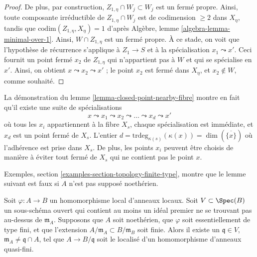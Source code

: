 \begin{proof}
De plus, par construction, $Z_{1, \eta} \cap W_j \subset W_j$
est un fermé propre. Ainsi, toute composante irréductible de
$Z_{1, \eta} \cap W_j$ est de codimension $\geq 2$ dans $X_\eta$,
tandis que $\text{codim}(Z_{1, \eta}, X_\eta) = 1$ d'après
Algèbre, lemme \ref{algebra-lemma-minimal-over-1}.
Ainsi, $W \cap Z_{1, \eta}$ est un fermé propre.
À ce stade, on voit que l'hypothèse de récurrence s'applique à
$Z_1 \to S$ et à la spécialisation $x_1 \leadsto x'$.
Ceci fournit un point fermé $x_2$ de $Z_{1, \eta}$ qui n'appartient pas
à $W$ et qui se spécialise en $x'$. Ainsi, on obtient
$x \leadsto x_2 \leadsto x'$ ; le point $x_2$ est fermé dans $X_\eta$,
et $x_2 \not \in W$, comme souhaité.
\end{proof}

\begin{remark}
\label{remark-full-specialization-sequence}
La démonstration du
lemme \ref{lemma-closed-point-nearby-fibre}
montre en fait qu'il existe une suite de spécialisations
$$
x \leadsto x_1 \leadsto x_2 \leadsto \ldots \leadsto x_d \leadsto x'
$$
où tous les $x_i$ appartiennent à la fibre $X_s$, chaque spécialisation est
immédiate, et $x_d$ est un point fermé de $X_s$. L'entier
$d = \text{trdeg}_{\kappa(s)}(\kappa(x)) = \dim(\overline{\{x\}})$
où l'adhérence est prise dans $X_s$. De plus, les points
$x_i$ peuvent être choisis de manière à éviter tout fermé de $X_s$ qui
ne contient pas le point $x$.
\end{remark}

\noindent
Exemples, section \ref{examples-section-topology-finite-type},
montre que le lemme suivant est faux si $A$ n'est pas supposé
noethérien.

\begin{lemma}
\label{lemma-quasi-finite-quasi-section-meeting-nearby-open}
Soit $\varphi : A \to B$ un homomorphisme local d'anneaux locaux.
Soit $V \subset \Spec(B)$ un sous-schéma ouvert
qui contient au moins un idéal premier ne se trouvant pas au-dessus de $\mathfrak m_A$.
Supposons que $A$ soit noethérien, que $\varphi$ soit essentiellement de type fini, et que
l'extension $A/\mathfrak m_A \subset B/\mathfrak m_B$ soit finie.
Alors il existe un $\mathfrak q \in V$,
$\mathfrak m_A \not = \mathfrak q \cap A$, tel que
$A \to B/\mathfrak q$ soit le localisé d'un homomorphisme d'anneaux quasi-fini.
\end{lemma}

